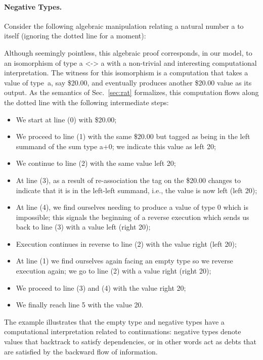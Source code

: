 \documentclass[preprint]{sigplanconf}
\begin{document}
\paragraph*{Negative Types.} 
Consider the following algebraic manipulation relating a natural number {{a}}
to itself (ignoring the dotted line for a moment):
\begin{center}
\end{center}
Although seemingly pointless, this algebraic proof corresponds, in our model,
to an isomorphism of type {{a <-> a}} with a non-trivial and interesting
computational interpretation. The witness for this isomorphism is a
computation that takes a value of type~{{a}}, say \$20.00, and eventually
produces another \$20.00 value as its output. As the semantics of
Sec.~\ref{sec:rat} formalizes, this computation flows along the dotted line
with the following intermediate steps:
\begin{itemize}
\item We start at line (0) with \$20.00; 
\item We proceed to line (1) with the same \$20.00 but tagged as being
  in the left summand of the sum type {{a+0}}; we indicate this value
  as {{left 20}};
\item We continue to line (2) with the same value {{left 20}};
\item At line (3), as a result of re-association the tag on the \$20.00
  changes to indicate that it is in the left-left summand, i.e., the value is
  now {{left (left 20)}};
\item At line (4), we find ourselves needing to produce a value of type 0
  which is impossible; this signals the beginning of a reverse execution
  which sends us back to line (3) with a value {{left (right 20)}};
\item Execution continues in reverse to line (2) with the value 
  {{right (left 20)}};
\item At line (1) we find ourselves again facing an empty type so we reverse
  execution again; we go to line (2) with a value {{right (right 20)}};
\item We proceed to line (3) and (4) with the value {{right 20}};
\item We finally reach line 5 with the value {{20}}.
\end{itemize}
The example illustrates that the empty type and negative types have a
computational interpretation related to continuations: negative types denote
values that backtrack to satisfy dependencies, or in other words act as debts
that are satisfied by the backward flow of information.
\end{document}
